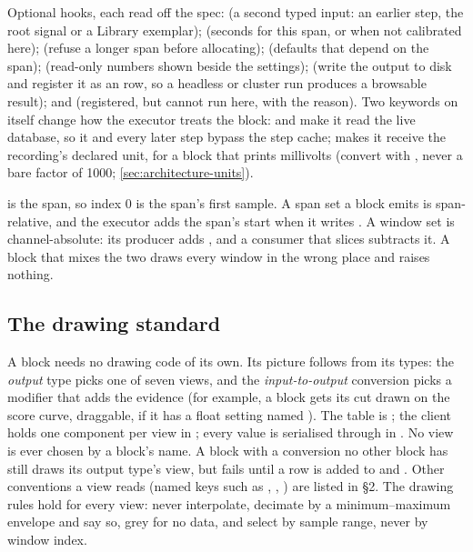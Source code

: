 Optional hooks, each read off the spec:  (a second typed input: an earlier step,
the root signal or a Library exemplar);  (seconds for this span, or  when
not calibrated here);  (refuse a longer span before allocating);
 (defaults that depend on the span);  (read-only numbers shown beside
the settings);  (write the output to disk and register it as an  row,
so a headless or cluster run produces a browsable result); and  (registered, but
cannot run here, with the reason). Two keywords on  itself change how the executor treats
the block:  and  make it read the live database, so it and every later
step bypass the step cache;  makes it receive the recording's declared unit, for a block
that prints millivolts (convert with , never a bare factor of 1000;
\cref{sec:architecture-units}).

\begin{watchout}
 is the span, so index 0 is the span's first sample. A span set a block emits is
span-relative, and the executor adds the span's start when it writes . A window
set is channel-absolute: its producer adds , and a consumer that slices 
subtracts it. A block that mixes the two draws every window in the wrong place and raises nothing.
\end{watchout}

\subsection{The drawing standard}
A block needs no drawing code of its own. Its picture follows from its types: the \emph{output} type
picks one of seven views, and the \emph{input-to-output} conversion picks a modifier that adds the
evidence (for example, a  block gets its cut drawn on the score curve,
draggable, if it has a float setting named ). The table is
; the client holds one component per view in
; every value is serialised through
 in . No view is ever chosen by a block's name. A
block with a conversion no other block has still draws its output type's view, but
 fails until a row is added to  and
. Other conventions a view reads (named  keys such as ,
, ) are listed in  \S2. The drawing rules
hold for every view: never interpolate, decimate by a minimum--maximum envelope and say so, grey for
no data, and select by sample range, never by window index.

